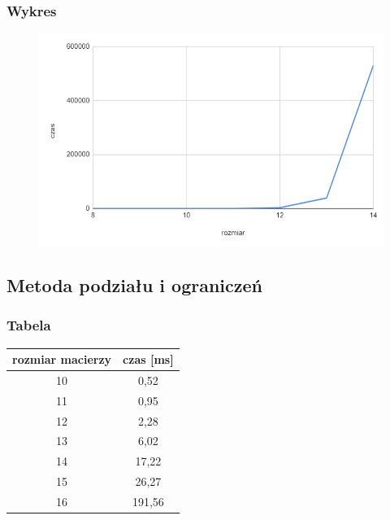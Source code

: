 \documentclass{article}
\begin{document}
\subsubsection{Wykres}
\begin{figure}[h]
    \centering
    \includegraphics[scale=0.3]{img/wykres1.png}
\end{figure}


\newpage

\subsection{Metoda podziału i ograniczeń}

\subsubsection{Tabela}
\vspace{1cm}
\begin{table}[h]
    \centering
    \begin{tabular}{|c|c|}
    \hline
        rozmiar macierzy & czas [ms]  \\ \hline
        10 & 0,52  \\ \hline
        11 & 0,95  \\ \hline
        12 & 2,28  \\ \hline
        13 & 6,02  \\ \hline
        14 & 17,22  \\ \hline
        15 & 26,27  \\ \hline
        16 & 191,56 \\ \hline
    \end{tabular}
\end{table}
\end{document}
